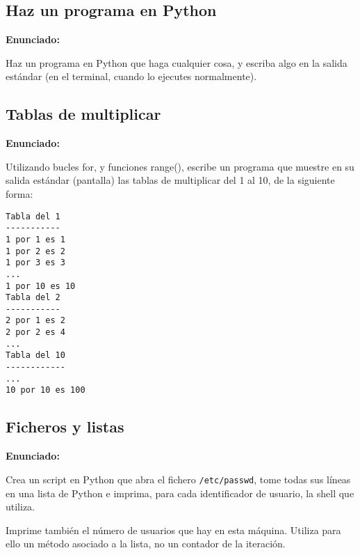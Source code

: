 \subsection{Haz un programa en Python}
\label{subsec:eje-python-primer-programa}

\textbf{Enunciado:}

Haz un programa en Python que haga cualquier cosa, y escriba algo en la salida estándar (en el terminal, cuando lo ejecutes normalmente).


\subsection{Tablas de multiplicar}
\label{subsec:eje-python-tablas}

\textbf{Enunciado:}

Utilizando bucles for, y funciones range(), escribe un programa que muestre en su salida estándar (pantalla) las tablas de multiplicar del 1 al 10, de la siguiente forma:

\begin{verbatim}
Tabla del 1
-----------
1 por 1 es 1
1 por 2 es 2
1 por 3 es 3
...
1 por 10 es 10
Tabla del 2
-----------
2 por 1 es 2
2 por 2 es 4
...
Tabla del 10
------------
...
10 por 10 es 100
\end{verbatim}

\subsection{Ficheros y listas}
\label{subsec:ficheros-listas}

\textbf{Enunciado:}

Crea un script en Python que abra el fichero \verb|/etc/passwd|, tome todas sus líneas en una lista de Python e imprima, para cada identificador de usuario, la shell que utiliza.

Imprime también el número de usuarios que hay en esta máquina. Utiliza para
ello un método asociado a la lista, no un contador de la iteración.

